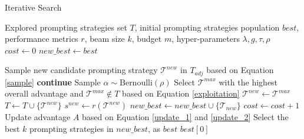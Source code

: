\begin{algorithm*}[h]
\caption{Iterative Search}
\label{algorithm:search}
\begin{algorithmic}[1]
\small
\Require Explored prompting strategies set $T$, initial prompting strategies population $best$, performance metrics $r$, beam size $k$, budget $m$, hyper-parameters $\lambda, g, \tau, \rho$
\State $cost \gets 0 $
\State $new\_best \gets best$

\State Sample new candidate prompting strategy $\mathcal{T}^{new}$ in $T_{adj}$ based on Equation \ref{sample}
\State \textbf{continue} 
\EndIf
\State Sample $\alpha \sim \text{Bernoulli}(\rho)$
\If {$\alpha$}
\State Select $\mathcal{T}^{max}$ with the highest overall advantage and $\mathcal{T}^{max} \notin T$ based on Equation \ref{exploitation}
\State $\mathcal{T}^{new} \gets \mathcal{T}^{max} $
\EndIf
\State $T \gets T \cup \{\mathcal{T}^{new}\} $
\State $s^{new} \gets r(\mathcal{T}^{new})$
\State $new\_best \gets new\_best \cup \{\mathcal{T}_{new}\}$
\State $cost \gets cost + 1$
\State Update advantage $A$ based on Equation \ref{update_1} and \ref{update_2}
\EndIf
\EndFor
\EndFor
\State Select the best $k$ prompting strategies in $new\_best$, as $best$
\EndWhile
\State \Return $ best[0] $
\end{algorithmic}
\end{algorithm*}















